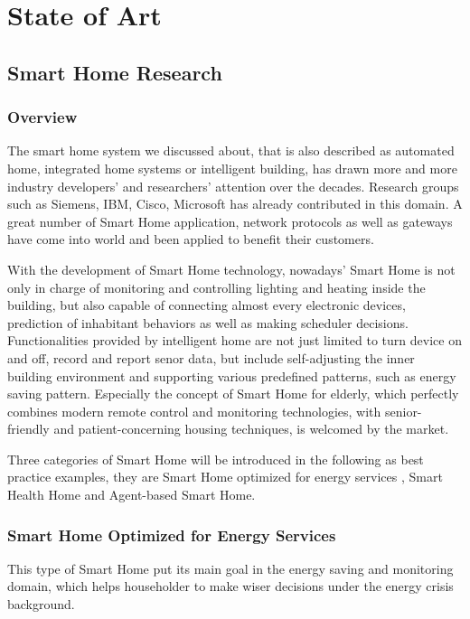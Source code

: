 \chapter{State of Art}
\section{Smart Home Research}
\subsection{Overview}
The smart home system we discussed about, that is also described as automated home, integrated home systems or intelligent building\cite{smart_home_concept}, has drawn more and more industry developers' and researchers' attention over the decades. Research groups such as Siemens, IBM, Cisco, Microsoft\cite{smart_home_research} has already contributed in this domain. A great number of Smart Home application, network protocols as well as gateways\cite{smart_home_for_gateway} have come into world and been applied to benefit their customers.

With the development of Smart Home technology, nowadays' Smart Home is not only in charge of monitoring and controlling lighting and heating inside the building, but also capable of connecting almost every electronic devices, prediction of inhabitant behaviors as well as making scheduler decisions. Functionalities provided by intelligent home are not just limited to turn device on and off, record and report senor data, but include self-adjusting the inner building environment and supporting various predefined patterns, such as energy saving pattern. Especially the concept of Smart Home for elderly\cite{smart_home_for_old}, which perfectly combines modern remote control and monitoring technologies, with senior-friendly and patient-concerning housing techniques, is welcomed by the market. 

Three categories of Smart Home will be introduced in the following as best practice examples, they are Smart Home optimized for energy services , Smart Health Home and Agent-based Smart Home.
 
\subsection{Smart Home Optimized for Energy Services}
This type of Smart Home put its main goal in the energy saving and monitoring domain, which helps householder to make wiser decisions under the energy crisis background. 

